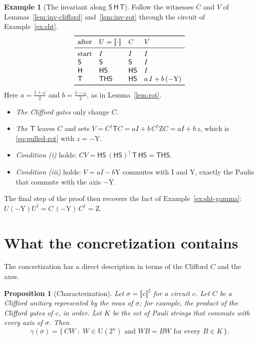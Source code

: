 \documentclass[11pt]{article}
\newtheorem{proposition}[theorem]{Proposition}
\theoremstyle{definition}
\newtheorem{example}[theorem]{Example}
\theoremstyle{remark}
\newcommand{\Unit}{\mathrm{U}(2^n)}
\newcommand{\sem}[1]{\llbracket #1 \rrbracket}
\newcommand{\abs}[1]{\llbracket #1 \rrbracket^{\sharp}}
\newcommand{\adj}{^{\dagger}}
\newcommand{\gam}{\gamma}
\newcommand{\tI}{\mathrm{I}}
\newcommand{\tY}{\mathrm{Y}}
\newcommand{\tZ}{\mathrm{Z}}
\newcommand{\gate}[1]{\mathsf{#1}}
\begin{document}
\begin{example}[The invariant along $\gate S\,\gate H\,\gate T$]\label{ex:inv}
Follow the witnesses $C$ and $V$ of Lemmas~\ref{lem:inv-clifford} and~\ref{lem:inv-rot}
through the circuit of Example~\ref{ex:sht}.
\[
\begin{array}{llll}
\toprule
\text{after} & U = \sem{\cdot} & C & V \\
\midrule
\text{start} & I & I & I \\
\gate S & \gate S & \gate S & I \\
\gate H & \gate H\gate S & \gate H\gate S & I \\
\gate T & \gate T\gate H\gate S & \gate H\gate S & a\,I + b\,(-\tY) \\
\bottomrule
\end{array}
\]
Here $a = \tfrac{1+\omega}{2}$ and $b = \tfrac{1-\omega}{2}$, as in Lemma~\ref{lem:rot}.
\begin{itemize}[nosep]
  \item \emph{The Clifford gates} only change $C$.
  \item \emph{The $\gate T$} leaves $C$ and sets
  $V = C\adj \gate T C = aI + b\,C\adj \tZ C = aI + b\,z$, which is \eqref{eq:pulled-rot}
  with $z = -\tY$.
  \item \emph{Condition (i)} holds: $CV = \gate H\gate S\,(\gate H\gate S)\adj\,\gate T\,\gate H\gate S = \gate T\gate H\gate S$.
  \item \emph{Condition (iii)} holds: $V = aI - b\tY$ commutes with $\tI$ and $\tY$, exactly the
  Paulis that commute with the axis $-\tY$.
\end{itemize}
The final step of the proof then recovers the fact of Example~\ref{ex:sht-gamma}:
$U(-\tY)U\adj = C\,(-\tY)\,C\adj = \tZ$.
\end{example}

\section{What the concretization contains}

The concretization has a direct description in terms of the Clifford $C$ and the axes.

\begin{proposition}[Characterization]\label{prop:char}
Let $\sigma = \abs{c}$ for a circuit $c$. Let $C$ be a Clifford unitary represented by
the rows of $\sigma$; for example, the product of the Clifford gates of $c$, in order. Let
$K$ be the set of Pauli strings that commute with every axis of $\sigma$. Then
\[
  \gam(\sigma) = \bigl\{\, C W \;:\; W \in \Unit \text{ and } W B = B W \text{ for every } B \in K \,\bigr\}.
\]
\end{proposition}
\end{document}
